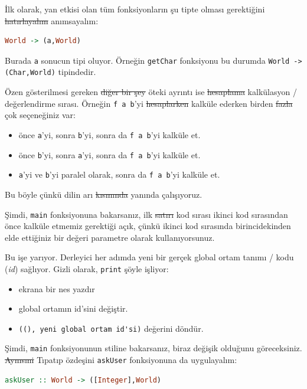 \documentclass[a4paper,14pt,openany]{extbook} %
\providecommand{\tightlist}{%
  \setlength{\itemsep}{0pt}\setlength{\parskip}{0pt}}
\let\emph\textit
\begin{document}
İlk olarak, yan etkisi olan tüm fonksiyonların şu tipte olması
gerektiğini \st{hatırlayalım} anımsayalım:

\begin{lstlisting}[language=Haskell]
  World -> (a,World)
\end{lstlisting}

Burada \lstinline!a! sonucun tipi oluyor. Örneğin \lstinline!getChar!
fonksiyonu bu durumda \lstinline!World -> (Char,World)! tipindedir.

Özen gösterilmesi gereken \st{diğer bir şey} öteki ayrıntı ise
\st{hesaplama} kalkülasyon / değerlendirme sırası.
Örneğin \lstinline!f a b!'yi \st{hesaplarken} kalküle ederken birden \st{fazla} çok
seçeneğiniz var:

\begin{itemize}
  \tightlist
\item
  önce \lstinline!a!'yi, sonra \lstinline!b!'yi, sonra da
  \lstinline!f a b!'yi kalküle et.
\item
  önce \lstinline!b!'yi, sonra \lstinline!a!'yi, sonra da
  \lstinline!f a b!'yi kalküle et.
\item
  \lstinline!a!'yi ve \lstinline!b!'yi paralel olarak, sonra da
  \lstinline!f a b!'yi kalküle et.
\end{itemize}

Bu böyle çünkü dilin arı \st{kısmında} yanında çalışıyoruz.

Şimdi, \lstinline!main! fonksiyonuna bakarsanız, ilk \st{satırı} kod sırası ikinci
kod sırasından önce kalküle etmemiz gerektiği açık, çünkü ikinci kod sırasında birincidekinden
elde ettiğiniz bir değeri parametre olarak kullanıyorsunuz.

Bu işe yarıyor. Derleyici her adımda yeni bir gerçek global ortam tanımı / kodu
(\emph{id}) sağlıyor. Gizli olarak, \lstinline!print! şöyle işliyor:

\begin{itemize}
  \tightlist
\item
  ekrana bir nes yazdır
\item
  global ortamın id'sini değiştir.
\item
  \lstinline!((), yeni global ortam id'si)! değerini döndür.
\end{itemize}

Şimdi, \lstinline!main! fonksiyonunun stiline bakarsanız, biraz
değişik olduğunu göreceksiniz. \st{Aynısıni} Tıpatıp özdeşini \lstinline!askUser! fonksiyonuna
da uygulayalım:

\begin{lstlisting}[language=Haskell]
  askUser :: World -> ([Integer],World)
\end{lstlisting}
\end{document}
